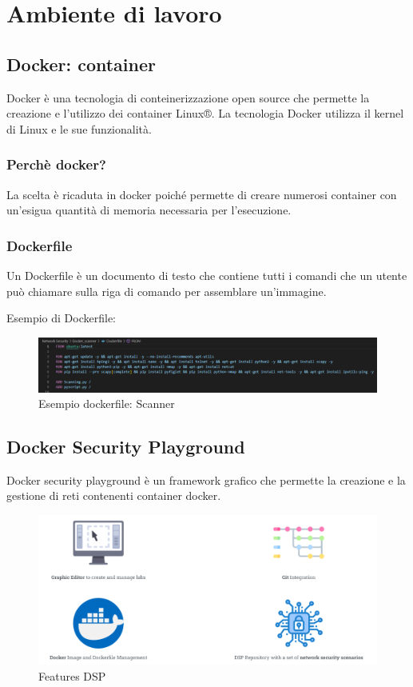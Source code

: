 \setcounter{secnumdepth}{5}

\chapter{Ambiente di lavoro}

\section{Docker: container}

Docker è una tecnologia di conteinerizzazione open source che permette la creazione e l'utilizzo dei container Linux®. La tecnologia Docker utilizza il kernel di Linux e le sue funzionalità. 

\subsection{Perchè docker?}
La scelta è ricaduta in docker poiché permette di creare numerosi container con un'esigua quantità di memoria necessaria per l'esecuzione.

\subsection{Dockerfile}
Un Dockerfile è un documento di testo che contiene tutti i comandi che un utente può chiamare sulla riga di comando per assemblare un'immagine. 

Esempio di Dockerfile:
\begin{figure}[h]
\includegraphics[scale=0.4]{UNINA_MSc_Thesis_Project/img/Dockerfile scanner.png}
\caption{Esempio dockerfile: Scanner}
\end{figure}

\section{Docker Security Playground}
Docker security playground è un framework grafico che permette la creazione e la gestione di reti contenenti container docker. 

\begin{figure}[h]
\includegraphics[scale=0.3]{UNINA_MSc_Thesis_Project/img/DSP_Features.png}
\centering
\caption{Features DSP}
\end{figure}

